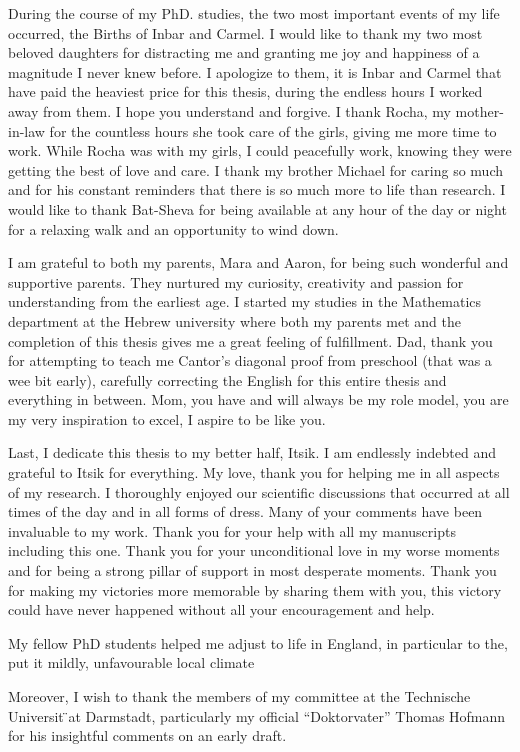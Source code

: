 \begin{acknowledgements}
During the course of my PhD. studies, the two most important events of my life occurred, the Births of Inbar and Carmel. I would like to thank my two most beloved daughters for distracting me and granting me joy and happiness of a magnitude I never knew before. I apologize to them, it is Inbar and Carmel that have paid the heaviest price for this thesis, during the endless hours I worked away from them. I hope you understand and forgive. I thank Rocha, my mother-in-law for the countless hours she took care of the girls, giving me more time to work. While Rocha was with
my girls, I could peacefully work, knowing they were getting the best of love and care. I thank my brother Michael for caring so much and for his constant reminders that there is so much more to life than research. I would like to thank Bat-Sheva for being available at any hour of the day or night for a relaxing walk and an opportunity to wind down.

I am grateful to both my parents, Mara and Aaron, for being such wonderful and supportive parents. They nurtured my curiosity, creativity and passion for understanding from the earliest age. I started my studies in the Mathematics department at the Hebrew university where both my parents
met and the completion of this thesis gives me a great feeling of fulfillment. Dad, thank you for attempting to teach me Cantor’s diagonal proof from preschool (that was a wee bit early), carefully correcting the English for this entire thesis and everything in between. Mom, you have and will always be my role model, you are my very inspiration to excel, I aspire to be like you.

Last, I dedicate this thesis to my better half, Itsik. I am endlessly indebted and grateful to Itsik for everything. My love, thank you for helping me in all aspects of my research. I thoroughly enjoyed our scientific discussions that occurred at all times of the day and in all forms of dress. Many of your comments have been invaluable to my work. Thank you for your help with all my manuscripts including this one. Thank you for your unconditional love in my worse moments and for being a strong pillar of support in most desperate moments. Thank you for making my victories
more memorable by sharing them with you, this victory could have never happened without all your encouragement and help.

My fellow PhD students helped me adjust to life in England, in particular to the, put it mildly, unfavourable local climate 


Moreover, I wish to thank the members of my committee at the Technische Universit ̈at Darmstadt, particularly my official “Doktorvater” Thomas Hofmann for his insightful comments on an early draft.



\end{acknowledgements}
